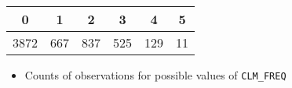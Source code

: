 \documentclass[]{article}
\providecommand{\tightlist}{%
  \setlength{\itemsep}{0pt}\setlength{\parskip}{0pt}}
\begin{document}
\begin{longtable}[]{@{}cccccc@{}}
\toprule
\begin{minipage}[b]{0.08\columnwidth}\centering\strut
0\strut
\end{minipage} & \begin{minipage}[b]{0.07\columnwidth}\centering\strut
1\strut
\end{minipage} & \begin{minipage}[b]{0.07\columnwidth}\centering\strut
2\strut
\end{minipage} & \begin{minipage}[b]{0.07\columnwidth}\centering\strut
3\strut
\end{minipage} & \begin{minipage}[b]{0.07\columnwidth}\centering\strut
4\strut
\end{minipage} & \begin{minipage}[b]{0.07\columnwidth}\centering\strut
5\strut
\end{minipage}\tabularnewline
\midrule
\endhead
\begin{minipage}[t]{0.08\columnwidth}\centering\strut
3872\strut
\end{minipage} & \begin{minipage}[t]{0.07\columnwidth}\centering\strut
667\strut
\end{minipage} & \begin{minipage}[t]{0.07\columnwidth}\centering\strut
837\strut
\end{minipage} & \begin{minipage}[t]{0.07\columnwidth}\centering\strut
525\strut
\end{minipage} & \begin{minipage}[t]{0.07\columnwidth}\centering\strut
129\strut
\end{minipage} & \begin{minipage}[t]{0.07\columnwidth}\centering\strut
11\strut
\end{minipage}\tabularnewline
\bottomrule
\end{longtable}

\begin{itemize}
\tightlist
\item
  Counts of observations for possible values of \texttt{CLM\_FREQ}
\end{itemize}
\end{document}
